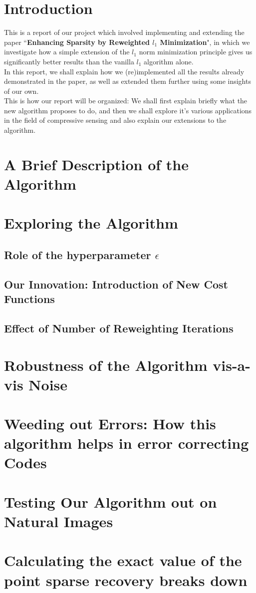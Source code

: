 \documentclass[a4paper,14pt]{article}
\numberwithin{definition}{section}
\numberwithin{mytheorem}{subsection}
\begin{document}

\date{Spring 2022}
\maketitle

\justifying
\tableofcontents

\newpage
\justifying
\section*{Introduction}
This is a report of our project which involved implementing and extending the paper ``\textbf{Enhancing Sparsity by Reweighted $l_1$ Minimization}", in which we investigate how a simple extension of the $l_1$ norm minimization principle gives us significantly better results than the vanilla $l_1$ algorithm alone.\\
In this report, we shall explain how we (re)implemented all the results already demonstrated in the paper, as well as extended them further using some insights of our own.\\
This is how our report will be organized: We shall first explain briefly what the new algorithm proposes to do, and then we shall explore it's various applications in the field of compressive sensing and also explain our extensions to the algorithm.
\section{A Brief Description of the Algorithm}
\section{Exploring the Algorithm}
\subsection{Role of the hyperparameter $\epsilon$}
\subsection{Our Innovation: Introduction of New Cost Functions}
\subsection{Effect of Number of Reweighting Iterations}
\section{Robustness of the Algorithm vis-a-vis Noise}
\section{Weeding out Errors: How this algorithm helps in error correcting Codes}
\section{Testing Our Algorithm out on Natural Images}
\section{Calculating the exact value of the point sparse recovery breaks down}
\end{document}
